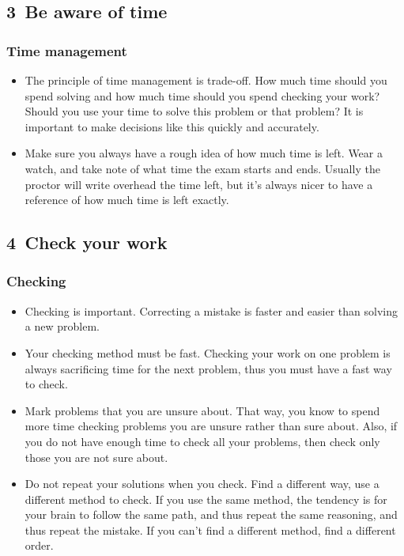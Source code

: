 \documentclass[10pt,paper=letter]{scrartcl}
\begin{document}
\subsection*{3 \,Be aware of time}

\subsubsection*{Time management}

\begin{itemize}

\item The principle of time management is trade-off. How much time should you spend solving and how much time should you spend checking your work? Should you use your time to solve this problem or that problem? It is important to make decisions like this quickly and accurately.

\item Make sure you always have a rough idea of how much time is left. Wear a watch, and take note of what time the exam starts and ends. Usually the proctor will write overhead the time left, but it's always nicer to have a reference of how much time is left exactly.

\end{itemize}

\subsection*{4 \,Check your work}

\subsubsection*{Checking}

\begin{itemize}

\item Checking is important. Correcting a mistake is faster and easier than solving a new problem.

\item Your checking method must be fast. Checking your work on one problem is always sacrificing time for the next problem, thus you must have a fast way to check.

\item Mark problems that you are unsure about. That way, you know to spend more time checking problems you are unsure rather than sure about. Also, if you do not have enough time to check all your problems, then check only those you are not sure about.

\item Do not repeat your solutions when you check. Find a different way, use a different method to check. If you use the same method, the tendency is for your brain to follow the same path, and thus repeat the same reasoning, and thus repeat the mistake. If you can't find a different method, find a different order.

\end{itemize}
\end{document}
